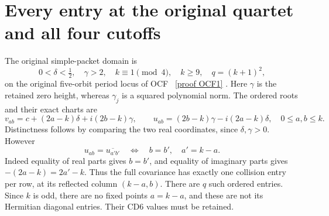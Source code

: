 \documentclass[11pt]{article}
\begin{document}
\section{Every entry at the original quartet and all four cutoffs}

The original simple-packet domain is
\[
 0<\delta<\tfrac12,\quad \gamma>2,\quad k\equiv1\pmod4,
 \quad k\geq9,\quad q=(k+1)^2,
\]
on the original five-orbit period locus of OCF \cite{cdroot:OCF}%
~\href{https://github.com/KokunoYumeto/zeta-function-research-reader/blob/5992ad50c0f2a06921f1fcaded7b4e38097c0739/workbenches/splitzero-tandem/continuations/20260920-original-kernel-mixed-determinants/providers/ORIGINAL_CONDUCTOR_STRIP_FRAME.tex\#L27}{[proof OCF1]}%
{}. Here
\(\gamma\) is the retained zero height, whereas \(\gamma_j\) is a
squared polynomial norm. The ordered roots and their exact charts are
\begin{equation}\label{cdroot:eq:roots}
 v_{ab}=c+(2a-k)\delta+i(2b-k)\gamma,
 \qquad u_{ab}=(2b-k)\gamma-i(2a-k)\delta,
 \quad 0\leq a,b\leq k.
 \tag{CD12}
\end{equation}
Distinctness follows by comparing the two real coordinates, since
\(\delta,\gamma>0\). However
\[
 u_{ab}=\overline{u_{a'b'}}
 \quad\Longleftrightarrow\quad b=b',\quad a'=k-a.
\]
Indeed equality of real parts gives \(b=b'\), and equality of imaginary
parts gives \(-(2a-k)=2a'-k\). Thus the full covariance has exactly
one collision entry per row, at its reflected column \((k-a,b)\).
There are \(q\) such ordered entries. Since \(k\) is odd, there are no
fixed points \(a=k-a\), and these are not its Hermitian diagonal
entries. Their CD6 values must be retained.
\end{document}
